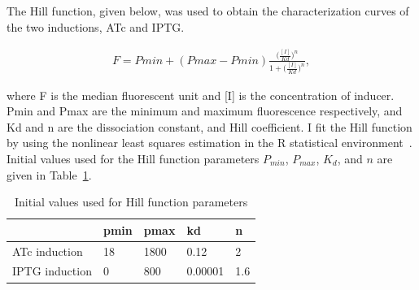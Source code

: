 The Hill function, given below, was used to obtain the characterization curves of the two inductions, ATc and IPTG. 

\begin{align}
 	F = Pmin + (Pmax - Pmin)\frac{\Big(\frac{[I]}{Kd}\Big)^n}{1+\Big(\frac{[I]}{Kd}\Big)^n},
\end{align}
 
where F is the median fluorescent unit and [I] is the concentration of inducer. Pmin and Pmax are the minimum and maximum fluorescence respectively, and Kd and n are the dissociation constant, and Hill coefficient. I fit the Hill function by using the nonlinear least squares estimation in the R statistical environment~\autocite{R:2008}. Initial values used for the Hill function parameters $P_{min}$, $P_{max}$, $K_d$, and $n$ are given in Table~\ref{tab:hill_initial}.



\begin{table}[htbp]
\centering
\caption{Initial values used for Hill function parameters}
\label{tab:hill_initial}
\begin{tabular}{@{}lllll@{}}
\toprule
 & pmin & pmax & kd & n \\ \midrule
ATc induction & 18 & 1800 & 0.12 & 2 \\
IPTG induction & 0 & 800 & 0.00001 & 1.6 \\ \bottomrule
\end{tabular}
\end{table}

